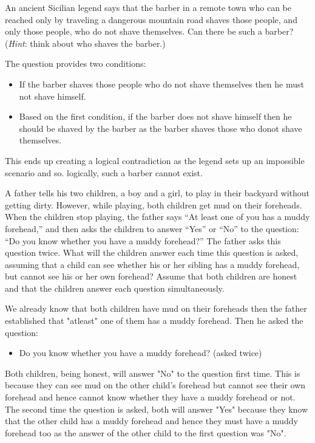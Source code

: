 \documentclass[a4paper]{exam}
\begin{document}
\begin{questions}
  \question An ancient Sicilian legend says that the barber in a remote town who can be reached only by traveling a dangerous mountain road shaves those people, and only those people, who do not shave themselves. Can there be such a barber? (\textit{Hint}: think about who shaves the barber.)
  \begin{solution}
    
    The question provides two conditions:
    \begin{itemize}
      \item If the barber shaves those people who do not shave themselves then he must not shave himself.
      \item Based on the first condition, if the barber does not shave himself then he should be shaved by the barber as the barber shaves those who donot shave themselves.
    \end{itemize}
    This ends up creating a logical contradiction as the legend sets up an impossible scenario and so. logically, such a barber cannot exist. 
  \end{solution}
  
  \question A father tells his two children, a boy and a girl, to play in their backyard without getting dirty. However, while playing, both children get mud on their foreheads. When the children stop playing, the father says ``At least one of you has a muddy forehead,'' and then asks the children to answer ``Yes'' or ``No'' to the question: ``Do you know whether you have a muddy forehead?'' The father asks this question twice. What will the children answer each time this question is asked, assuming that a child can see whether his or her sibling has a muddy forehead, but cannot see his or her own forehead? Assume that both children are honest and that the children answer each question simultaneously.
  \begin{solution}
    We already know that both children have mud on their foreheads then the father established that "atleast" one of them has a muddy forehead. Then he asked the question:
    \begin{itemize}
      \item Do you know whether you have a muddy forehead? (asked twice)
    \end{itemize}
    Both children, being honest, will answer "No" to the question first time. This is because they can see mud on the other child's forehead but cannot see their own forehead and hence cannot know whether they have a muddy forehead or not. The second time the question is asked, both will answer "Yes" because they know that the other child has a muddy forehead and hence they must have a muddy forehead too as the answer of the other child to the first question was "No".
  \end{solution}
  

\end{questions}
\end{document}
